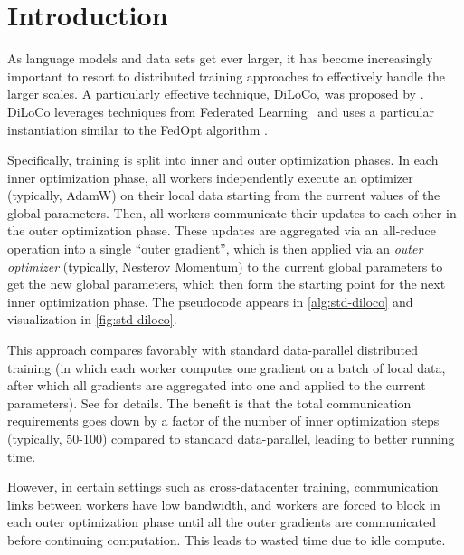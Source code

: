 \section{Introduction} \label{sec:intro}

As language models and data sets get ever larger, it has become increasingly important to resort to distributed training approaches to effectively handle the larger scales. A particularly effective technique, DiLoCo, was proposed by \citet{douillard2023diloco}. DiLoCo leverages techniques from Federated Learning~\citep{mcmahan2017fedavg} and uses a particular instantiation similar to the FedOpt algorithm \citep{reddi2021adaptive}. 

Specifically, training is split into inner and outer optimization phases. In each inner optimization phase, all workers independently execute an optimizer (typically, AdamW) on their local data starting from the current values of the global parameters. Then, all workers communicate their updates to each other in the outer optimization phase. These updates are aggregated via an all-reduce operation into a single ``outer gradient'', which is then applied via an \emph{outer optimizer} (typically, Nesterov Momentum) to the current global parameters to get the new global parameters, which then form the starting point for the next inner optimization phase. 
The pseudocode appears in \autoref{alg:std-diloco} and visualization in \autoref{fig:std-diloco}.


This approach compares favorably with standard data-parallel distributed training (in which each worker computes one gradient on a batch of local data, after which all gradients are aggregated into one and applied to the current parameters). See \citep{douillard2023diloco} for details. The benefit is that the total communication requirements goes down by a factor of the number of inner optimization steps (typically, 50-100) compared to standard data-parallel, leading to better running time.

However, in certain settings such as cross-datacenter training, communication links between workers have low bandwidth, and workers are forced to block in each outer optimization phase until all the outer gradients are communicated before continuing computation. This leads to wasted time due to idle compute. 

